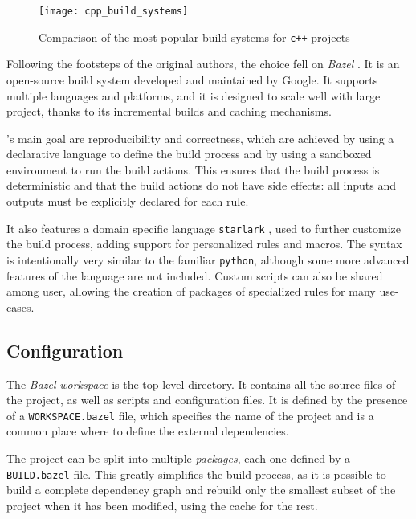 \begin{figure}[h]
    \centering
    \texttt{[image: cpp\_build\_systems]}
    \caption{Comparison of the most popular build systems for \texttt{c++} projects \cite{art:cpp-build-system}}\label{fig:cpp_build_systems}
\end{figure}

Following the footsteps of the original authors, the choice fell on \textit{Bazel} \cite{repo:bazel}.
It is an open-source build system developed and maintained by Google.
It supports multiple languages and platforms, and it is designed to scale well with large project, thanks to its incremental builds and caching mechanisms.

\bazel's main goal are reproducibility and correctness, which are achieved by using a declarative language to define the build process and by using a sandboxed environment to run the build actions.
This ensures that the build process is deterministic and that the build actions do not have side effects: all inputs and outputs must be explicitly declared for each rule.

It also features a domain specific language \texttt{starlark} \cite{repo:starlark}, used to further customize the build process, adding support for personalized rules and macros.
The syntax is intentionally very similar to the familiar \texttt{python}, although some more advanced features of the language are not included.
Custom scripts can also be shared among user, allowing the creation of packages of specialized rules for many use-cases.

\subsection*{Configuration}

The \textit{Bazel} \textit{workspace} is the top-level directory.
It contains all the source files of the project, as well as scripts and configuration files.
It is defined by the presence of a \texttt{WORKSPACE.bazel} file, which specifies the name of the project and is a common place where to define the external dependencies.



The project can be split into multiple \textit{packages}, each one defined by a \texttt{BUILD.bazel} file.
This greatly simplifies the build process, as it is possible to build a complete dependency graph and rebuild only the smallest subset of the project when it has been modified, using the cache for the rest.

